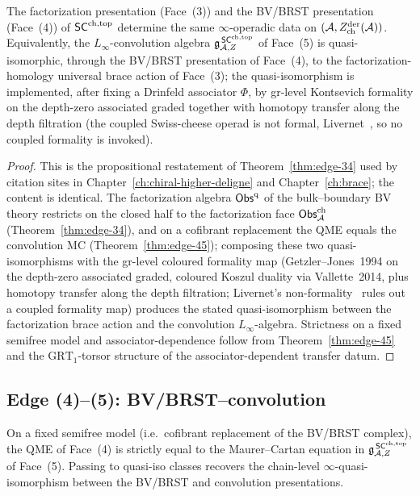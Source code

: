 \begin{proposition}\label{prop:heptagon-edge-34}%
%
The factorization presentation (Face~(3)) and the BV/BRST presentation
(Face~(4)) of $\mathsf{SC}^{\mathrm{ch},\mathrm{top}}$ determine the same $\infty$-operadic data on
$(\mathcal{A}, Z^{\mathrm{der}}_{\mathrm{ch}}(\mathcal{A}))$. Equivalently, the
$L_\infty$-convolution algebra $\mathfrak{g}^{\,\mathsf{SC}^{\mathrm{ch},\mathrm{top}}}_{\mathcal{A},Z}$ of Face~(5)
is quasi-isomorphic, through the BV/BRST presentation of Face~(4), to
the factorization-homology universal brace action of Face~(3); the
quasi-isomorphism is implemented, after fixing a Drinfeld associator
$\Phi$, by gr-level Kontsevich formality on the depth-zero associated
graded together with homotopy transfer along the depth filtration
(the coupled Swiss-cheese operad is not formal,
Livernet~\cite{Liv15}, so no coupled formality is invoked).
\end{proposition}

\begin{proof}
This is the propositional restatement of Theorem~\ref{thm:edge-34}
used by citation sites in Chapter~\ref{ch:chiral-higher-deligne} and
Chapter~\ref{ch:brace}; the content is identical. The factorization
algebra $\mathsf{Obs}^{\mathrm{q}}$ of the bulk--boundary BV theory restricts
on the closed half to the factorization face $\mathsf{Obs}^{\mathrm{ch}}_{\mathcal{A}}$
(Theorem~\ref{thm:edge-34}), and on a cofibrant replacement the QME
equals the convolution MC (Theorem~\ref{thm:edge-45}); composing these
two quasi-isomorphisms with the gr-level coloured formality map
(Getzler--Jones~1994 on the depth-zero associated graded, coloured
Koszul duality via Vallette~2014, plus homotopy transfer along the
depth filtration; Livernet's non-formality~\cite{Liv15} rules out a
coupled formality map) produces the stated quasi-isomorphism
between the factorization brace action and the convolution
$L_\infty$-algebra. Strictness on a fixed semifree model and
associator-dependence follow from Theorem~\ref{thm:edge-45} and the
$\mathrm{GRT}_1$-torsor structure of the associator-dependent
transfer datum.
\end{proof}

\subsection{Edge (4)--(5): BV/BRST--convolution}\label{subsec:edge-45}

\begin{theorem}
\label{thm:edge-45}%
On a fixed semifree model (i.e.\ cofibrant replacement of the
BV/BRST complex), the QME of Face~(4) is strictly equal to the
Maurer--Cartan equation in $\mathfrak{g}^{\,\mathsf{SC}^{\mathrm{ch},\mathrm{top}}}_{\mathcal{A},Z}$ of Face~(5).
Passing to quasi-iso classes recovers the chain-level
$\infty$-quasi-isomorphism between the BV/BRST and convolution
presentations.
\end{theorem}

